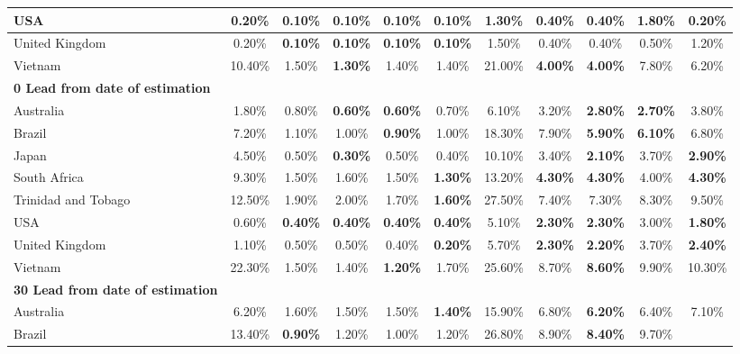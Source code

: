 \documentclass[10pt,letterpaper]{article}
\begin{document}
\begin{table}[!ht]
\begin{adjustwidth}{-2.25in}{0in}
\begin{tabular}{|l|c|c|c|c|c|c|c|c|c|c|}
        USA & 0.20\% & \textbf{0.10\%} & \textbf{0.10\%} & \textbf{0.10\%} & \textbf{0.10\%} & 1.30\% & 0.40\% & 0.40\% & 1.80\% & \textbf{0.20\%} \\ \hline
        United Kingdom & 0.20\% & \textbf{0.10\%} & \textbf{0.10\%} & \textbf{0.10\%} & \textbf{0.10\%} & 1.50\% & 0.40\% & 0.40\% & 0.50\% & 1.20\% \\ \hline
        Vietnam & 10.40\% & 1.50\% & \textbf{1.30\%} & 1.40\% & 1.40\% & 21.00\% & \textbf{4.00\%} & \textbf{4.00\%} & 7.80\% & 6.20\% \\ \hline
        \textbf{0 Lead from date of estimation}& ~ & ~ & ~ & ~ & ~ & ~ & ~ & ~ & ~ & ~ \\ \hline
        Australia & 1.80\% & 0.80\% & \textbf{0.60\%} & \textbf{0.60\%} & 0.70\% & 6.10\% & 3.20\% & \textbf{2.80\%} & \textbf{2.70\%} & 3.80\% \\ \hline
        Brazil & 7.20\% & 1.10\% & 1.00\% & \textbf{0.90\%} & 1.00\% & 18.30\% & 7.90\% & \textbf{5.90\%} & \textbf{6.10\%} & 6.80\% \\ \hline
        Japan & 4.50\% & 0.50\% & \textbf{0.30\%} & 0.50\% & 0.40\% & 10.10\% & 3.40\% & \textbf{2.10\%} & 3.70\% & \textbf{2.90\%} \\ \hline
        South Africa & 9.30\% & 1.50\% & 1.60\% & 1.50\% & \textbf{1.30\%} & 13.20\% & \textbf{4.30\%} & \textbf{4.30\%} & 4.00\% & \textbf{4.30\%} \\ \hline
        Trinidad and Tobago & 12.50\% & 1.90\% & 2.00\% & 1.70\% & \textbf{1.60\%} & 27.50\% & 7.40\% & 7.30\% & 8.30\% & 9.50\% \\ \hline
        USA & 0.60\% & \textbf{0.40\%} & \textbf{0.40\%} & \textbf{0.40\%} & \textbf{0.40\%} & 5.10\% & \textbf{2.30\%} & \textbf{2.30\%} & 3.00\% & \textbf{1.80\%} \\ \hline
        United Kingdom & 1.10\% & 0.50\% & 0.50\% & 0.40\% & \textbf{0.20\%} & 5.70\% & \textbf{2.30\%} & \textbf{2.20\%} & 3.70\% & \textbf{2.40\%} \\ \hline
        Vietnam & 22.30\% & 1.50\% & 1.40\% & \textbf{1.20\%} & 1.70\% & 25.60\% & 8.70\% & \textbf{8.60\%} & 9.90\% & 10.30\% \\ \hline
		\textbf{30 Lead from date of estimation} & ~ & ~ & ~ & ~ & ~ & ~ & ~ & ~ & ~ & ~ \\ \hline
        Australia & 6.20\% & 1.60\% & 1.50\% & 1.50\% & \textbf{1.40\%} & 15.90\% & 6.80\% & \textbf{6.20\%} & 6.40\% & 7.10\% \\ \hline
        Brazil & 13.40\% & \textbf{0.90\%} & 1.20\% & 1.00\% & 1.20\% & 26.80\% & 8.90\% & \textbf{8.40\%} & 9.70\% \\ \hline

\end{tabular}
\end{adjustwidth}
\end{table}
\end{document}
